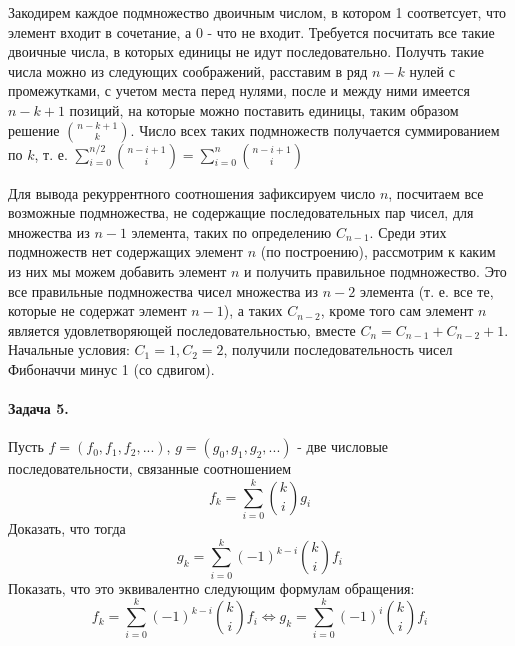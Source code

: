 \documentclass[a4paper,12pt]{article}
\begin{document}
\begin{Solution}
Закодирем каждое подмножество двоичным числом, в котором 1 соответсует, что элемент входит в сочетание, а 0 - что не входит. Требуется посчитать все такие двоичные числа, в которых единицы не идут последовательно. Получть такие числа можно из следующих соображений, расставим в ряд $n-k$ нулей с промежутками, с учетом места перед нулями, после и между ними имеется $n-k+1$ позиций, на которые можно поставить единицы, таким образом решение $\binom{n-k+1}{k}$. Число всех таких подмножеств получается суммированием по $k$, т. е. $\sum_{i=0}^{n/2}\binom{n-i+1}{i} = \sum_{i=0}^n \binom{n-i+1}{i}$

Для вывода рекуррентного соотношения зафиксируем число $n$, посчитаем все возможные подмножества, не содержащие последовательных пар чисел, для множества из $n-1$ элемента, таких по определению $C_{n-1}$. Среди этих подмножеств нет содержащих элемент $n$ (по построению), рассмотрим к каким из них мы можем добавить элемент $n$ и получить правильное подмножество. Это все правильные подмножества чисел множества из $n-2$ элемента (т. е. все те, которые не содержат элемент $n-1$), а таких $C_{n-2}$, кроме того сам элемент $n$ является удовлетворяющей последовательностью, вместе $C_n = C_{n-1}+C_{n-2}+1$. Начальные условия: $C_1 = 1, C_2 = 2$, получили последовательность чисел Фибоначчи минус 1 (со сдвигом).
\end{Solution}

\paragraph{Задача 5.} Пусть $f=\left(f_0,f_1,f_2,...\right)$, $g=\left(g_0,g_1,g_2,...\right)$ - две числовые последовательности, связанные соотношением
\[
	f_k = \sum_{i=0}^k \binom{k}{i} g_i
\]
Доказать, что тогда
\[
	g_k = \sum_{i=0}^k {\left(-1\right)}^{k-i}\binom{k}{i} f_i
\]
Показать, что это эквивалентно следующим формулам обращения:
\[
	f_k = \sum_{i=0}^k {\left(-1\right)}^{k-i} \binom{k}{i}f_i \Leftrightarrow g_k = \sum_{i=0}^k {\left(-1\right)}^i \binom{k}{i}f_i
\]
\end{document}
